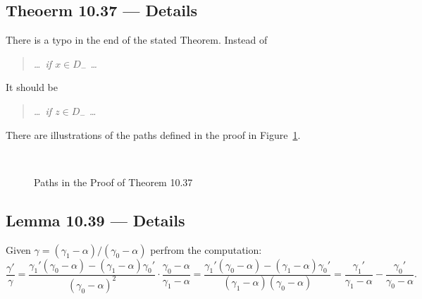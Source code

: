 \subsection{Theoerm 10.37 --- Details}

There is a typo in the end of the stated Theorem.
Instead of
\begin{quote}
\textsl{\ldots\ if \(x\in D_-\) \ldots}
\end{quote}
It should be
\begin{quote}
\textsl{\ldots\ if \(z\in D_-\) \ldots}
\end{quote}

There are illustrations of the paths defined in the proof 
in Figure~\ref{fig:10-37}.
\begin{figure}[ht] \label{fig:10-37} %
%
%
\hspace{0.1\textwidth}
%
%
\\[20pt]%
%
%
\hspace{0.1\textwidth}
%
%
\caption{Paths in the Proof of Theorem 10.37}
\end{figure}


\subsection{Lemma 10.39 --- Details}

Given \(\gamma = (\gamma_1 - \alpha) / (\gamma_0 - \alpha)\)
perfrom the computation:
\begin{equation*}
\frac{\gamma'}{\gamma}
= \frac{\gamma_1'(\gamma_0-\alpha) - (\gamma_1-\alpha)\gamma_0'}{
               (\gamma_0 - \alpha)^2}
   \cdot \frac{\gamma_0 - \alpha}{\gamma_1 - \alpha}
= \frac{\gamma_1'(\gamma_0-\alpha) - (\gamma_1-\alpha)\gamma_0'}{
               (\gamma_1 - \alpha)(\gamma_0 - \alpha)}
= \frac{\gamma_1'}{\gamma_1-\alpha} - \frac{\gamma_0'}{\gamma_0-\alpha}.
\end{equation*}

